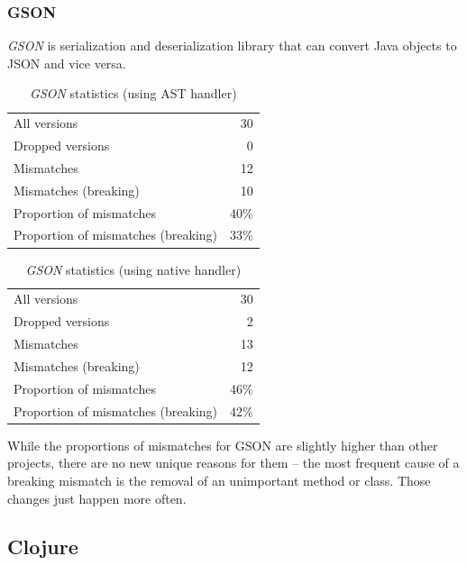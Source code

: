\documentclass{l4proj}
\begin{document}
\subsubsection{GSON}

\textit{GSON} \cite{GSON} is serialization and deserialization library that
can convert Java objects to JSON and vice versa.

\noindent
\begin{minipage}[t]{0.5\textwidth}
\begin{table}[H]
\centering
\begin{tabular}{|lr|}
All versions & 30 \\
Dropped versions & 0 \\
Mismatches & 12 \\
Mismatches (breaking) & 10 \\
Proportion of mismatches & 40\% \\
Proportion of mismatches (breaking) & 33\% \\
\end{tabular}
\caption{\textit{GSON} statistics (using AST handler)}
\label{GSONASTStatistics}
\end{table}
\end{minipage}
\begin{minipage}[t]{0.5\textwidth}
\begin{table}[H]
\centering
\begin{tabular}{|lr|}
All versions & 30 \\
Dropped versions & 2 \\
Mismatches & 13 \\
Mismatches (breaking) & 12 \\
Proportion of mismatches & 46\% \\
Proportion of mismatches (breaking) & 42\% \\
\end{tabular}
\caption{\textit{GSON} statistics (using native handler)}
\label{GSONNativeStatistics}
\end{table}
\end{minipage}

While the proportions of mismatches for GSON are slightly higher than
other projects, there are no new unique reasons for them -- the most
frequent cause of a breaking mismatch is the removal of an unimportant
method or class. Those changes just happen more often.

\subsection{Clojure}
\end{document}
